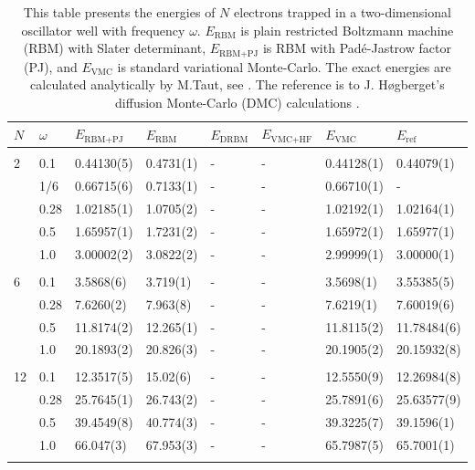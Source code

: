 \begin{table} [H]
	\caption{This table presents the energies of $N$ electrons trapped in a two-dimensional oscillator well with frequency $\omega$. $E_{\text{RBM}}$ is plain restricted Boltzmann machine (RBM) with Slater determinant, $E_{\text{RBM+PJ}}$ is RBM with Padé-Jastrow factor (PJ), and $E_{\text{VMC}}$ is standard variational Monte-Carlo. The exact energies are calculated analytically by M.Taut, see \cite{taut_two_1994}. The reference is to J. Høgberget's diffusion Monte-Carlo (DMC) calculations \cite{hogberget_quantum_2013}.} 
	\begin{tabularx}{\textwidth}{l:l|XXXXXX} \hline\hline
		\label{tab:quantumdotswinteraction2D}
		$N$ & $\omega$ & $E_{\text{RBM+PJ}}$ & $E_{\text{RBM}}$ & $E_{\text{DRBM}}$ & $E_{\text{VMC+HF}}$ & $E_{\text{VMC}}$ & $E_{\text{ref}} $ \\ \hline \\
		2 & 0.1 & 0.44130(5) & 0.4731(1) & - & - & 0.44128(1) & 0.44079(1)\\ 
		& 1/6 & 0.66715(6) & 0.7133(1) & - & - & 0.66710(1) & - \\
		& 0.28 & 1.02185(1) & 1.0705(2) & - & - & 1.02192(1) & 1.02164(1) \\
		& 0.5 & 1.65957(1) & 1.7231(2) & - & - & 1.65972(1) & 1.65977(1)  \\
		& 1.0 & 3.00002(2) & 3.0822(2) & - & - & 2.99999(1) & 3.00000(1) \\ \hdashline \\

		6 & 0.1 & 3.5868(6) & 3.719(1) & - & - & 3.5698(1) & 3.55385(5) \\ 
		& 0.28 & 7.6260(2) & 7.963(8) & - & - & 7.6219(1) & 7.60019(6) \\
		& 0.5 & 11.8174(2) & 12.265(1) & - & - & 11.8115(2) & 11.78484(6) \\
		& 1.0 & 20.1893(2) & 20.826(3) & - & - & 20.1905(2) & 20.15932(8) \\ \hdashline \\
		
		12 & 0.1 & 12.3517(5) & 15.02(6) & - & - & 12.5550(9) & 12.26984(8) \\ 
		& 0.28 & 25.7645(1) & 26.743(2) & - & - & 25.7891(6) & 25.63577(9) \\
		& 0.5 & 39.4549(8) & 40.774(3) & - & - & 39.3225(7) & 39.1596(1) \\
		& 1.0 & 66.047(3) & 67.953(3) & - & - & 65.7987(5) & 65.7001(1) \\ \hdashline \\
		

\end{tabularx}
\end{table}
